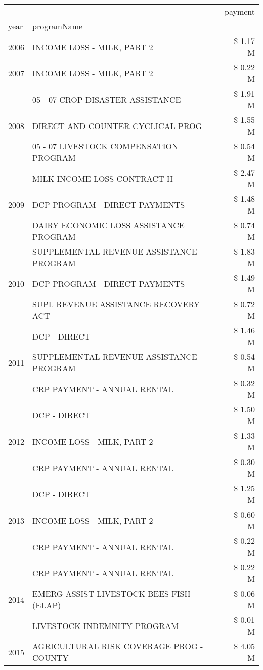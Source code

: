 \begin{tabular}{llr}
\toprule
 &  & payment \\
year & programName &  \\
\midrule
2006 & INCOME LOSS - MILK, PART 2 & \$ 1.17 M \\
\cline{1-3}
2007 & INCOME LOSS - MILK, PART 2 & \$ 0.22 M \\
\cline{1-3}
\multirow[t]{3}{*}{2008} & 05 - 07 CROP DISASTER ASSISTANCE & \$ 1.91 M \\
 & DIRECT AND COUNTER CYCLICAL PROG & \$ 1.55 M \\
 & 05 - 07 LIVESTOCK COMPENSATION PROGRAM & \$ 0.54 M \\
\cline{1-3}
\multirow[t]{3}{*}{2009} & MILK INCOME LOSS CONTRACT II & \$ 2.47 M \\
 & DCP PROGRAM - DIRECT PAYMENTS & \$ 1.48 M \\
 & DAIRY ECONOMIC LOSS ASSISTANCE PROGRAM & \$ 0.74 M \\
\cline{1-3}
\multirow[t]{3}{*}{2010} & SUPPLEMENTAL REVENUE ASSISTANCE PROGRAM & \$ 1.83 M \\
 & DCP PROGRAM - DIRECT PAYMENTS & \$ 1.49 M \\
 & SUPL REVENUE ASSISTANCE RECOVERY ACT & \$ 0.72 M \\
\cline{1-3}
\multirow[t]{3}{*}{2011} & DCP - DIRECT & \$ 1.46 M \\
 & SUPPLEMENTAL REVENUE ASSISTANCE PROGRAM & \$ 0.54 M \\
 & CRP PAYMENT - ANNUAL RENTAL & \$ 0.32 M \\
\cline{1-3}
\multirow[t]{3}{*}{2012} & DCP - DIRECT & \$ 1.50 M \\
 & INCOME LOSS - MILK, PART 2 & \$ 1.33 M \\
 & CRP PAYMENT - ANNUAL RENTAL & \$ 0.30 M \\
\cline{1-3}
\multirow[t]{3}{*}{2013} & DCP - DIRECT & \$ 1.25 M \\
 & INCOME LOSS - MILK, PART 2 & \$ 0.60 M \\
 & CRP PAYMENT - ANNUAL RENTAL & \$ 0.22 M \\
\cline{1-3}
\multirow[t]{3}{*}{2014} & CRP PAYMENT - ANNUAL RENTAL & \$ 0.22 M \\
 & EMERG ASSIST LIVESTOCK BEES FISH (ELAP) & \$ 0.06 M \\
 & LIVESTOCK INDEMNITY PROGRAM & \$ 0.01 M \\
\cline{1-3}
\multirow[t]{3}{*}{2015} & AGRICULTURAL RISK COVERAGE PROG - COUNTY & \$ 4.05 M \\

\end{tabular}
